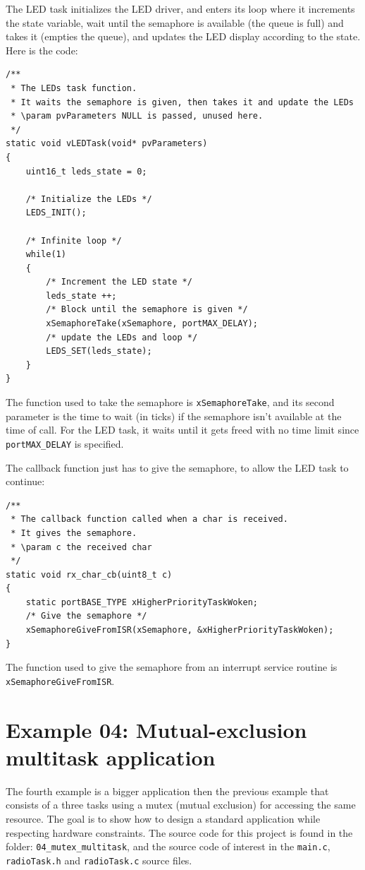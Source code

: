 \documentclass[11pt]{report}
\begin{document}
The LED task initializes the LED driver, and enters its loop where it increments the state variable, wait until the semaphore is available (the queue is full) and takes it (empties the queue), and updates the LED display according to the state. Here is the code:
\begin{verbatim}
/**
 * The LEDs task function.
 * It waits the semaphore is given, then takes it and update the LEDs
 * \param pvParameters NULL is passed, unused here.
 */
static void vLEDTask(void* pvParameters)
{
    uint16_t leds_state = 0;
    
    /* Initialize the LEDs */
    LEDS_INIT();
    
    /* Infinite loop */
    while(1)
    {
        /* Increment the LED state */
        leds_state ++;
        /* Block until the semaphore is given */
        xSemaphoreTake(xSemaphore, portMAX_DELAY);
        /* update the LEDs and loop */
        LEDS_SET(leds_state);
    }
}
\end{verbatim}

The function used to take the semaphore is \verb$xSemaphoreTake$, and its second parameter is the time to wait (in ticks) if the semaphore isn't available at the time of call. For the LED task, it waits until it gets freed with no time limit since \verb$portMAX_DELAY$ is specified.

The callback function just has to give the semaphore, to allow the LED task to continue:

\begin{verbatim}
/**
 * The callback function called when a char is received.
 * It gives the semaphore.
 * \param c the received char
 */
static void rx_char_cb(uint8_t c)
{
    static portBASE_TYPE xHigherPriorityTaskWoken;
    /* Give the semaphore */
    xSemaphoreGiveFromISR(xSemaphore, &xHigherPriorityTaskWoken);
}
\end{verbatim}

The function used to give the semaphore from an interrupt service routine is \verb$xSemaphoreGiveFromISR$.


\section{Example 04: Mutual-exclusion multitask application}

The fourth example is a bigger application then the previous example that consists of a three tasks using a mutex (mutual exclusion) for accessing the same resource. The goal is to show how to design a standard application while respecting hardware constraints. The source code for this project is found in the folder: \verb$04_mutex_multitask$, and the source code of interest in the \verb$main.c$, \verb$radioTask.h$ and \verb$radioTask.c$ source files.
\end{document}
